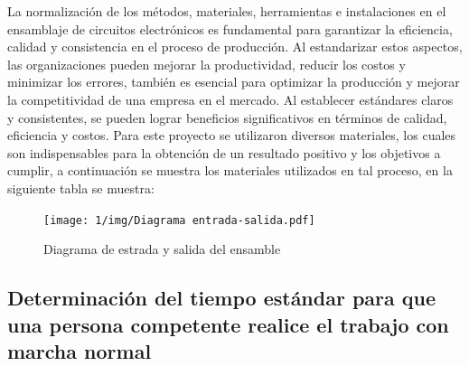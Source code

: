     La normalización de los métodos, materiales, herramientas e instalaciones en el ensamblaje de circuitos electrónicos es fundamental para garantizar la eficiencia, calidad y consistencia en el proceso de producción. Al estandarizar estos aspectos, las organizaciones pueden mejorar la productividad, reducir los costos y minimizar los errores, también es esencial para optimizar la producción y mejorar la competitividad de una empresa en el mercado. Al establecer estándares claros y consistentes, se pueden lograr beneficios significativos en términos de calidad, eficiencia y costos.
    Para este proyecto se utilizaron diversos materiales, los
    cuales son indispensables para la obtención de un resultado positivo y los objetivos a cumplir, a continuación se muestra los materiales utilizados en tal proceso, en la siguiente tabla se muestra:
     \begin{figure}[H] 
            \centering
            \texttt{[image: 1/img/Diagrama entrada-salida.pdf]}
            \caption{Diagrama de estrada y salida del ensamble}
            \label{fig:Diagrama entrada-salida}
        \end{figure}
    
    \subsection{Determinación del tiempo estándar para que una persona competente realice el trabajo con marcha normal}
    
